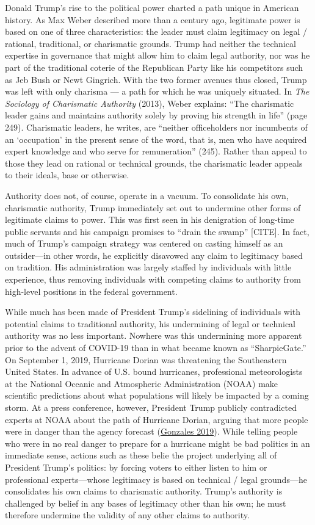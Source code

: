\documentclass[
  12pt,
]{article}
\begin{document}
Donald Trump's rise to the political power charted a path unique in American history. As Max Weber described more than a century ago, legitimate power is based on one of three characteristics: the leader must claim legitimacy on legal / rational, traditional, or charismatic grounds. Trump had neither the technical expertise in governance that might allow him to claim legal authority, nor was he part of the traditional coterie of the Republican Party like his competitors such as Jeb Bush or Newt Gingrich. With the two former avenues thus closed, Trump was left with only charisma --- a path for which he was uniquely situated. In \emph{The Sociology of Charismatic Authority} (2013), Weber explains: ``The charismatic leader gains and maintains authority solely by proving his strength in life'' (page 249). Charismatic leaders, he writes, are ``neither officeholders nor incumbents of an `occupation' in the present sense of the word, that is, men who have acquired expert knowledge and who serve for remuneration'' (245). Rather than appeal to those they lead on rational or technical grounds, the charismatic leader appeals to their ideals, base or otherwise.

Authority does not, of course, operate in a vacuum. To consolidate his own, charismatic authority, Trump immediately set out to undermine other forms of legitimate claims to power. This was first seen in his denigration of long-time public servants and his campaign promises to ``drain the swamp'' {[}CITE{]}. In fact, much of Trump's campaign strategy was centered on casting himself as an outsider---in other words, he explicitly disavowed any claim to legitimacy based on tradition. His administration was largely staffed by individuals with little experience, thus removing individuals with competing claims to authority from high-level positions in the federal government.

While much has been made of President Trump's sidelining of individuals with potential claims to traditional authority, his undermining of legal or technical authority was no less important. Nowhere was this undermining more apparent prior to the advent of COVID-19 than in what became known as ``SharpieGate.'' On September 1, 2019, Hurricane Dorian was threatening the Southeastern United States. In advance of U.S. bound hurricanes, professional meteorologists at the National Oceanic and Atmospheric Administration (NOAA) make scientific predictions about what populations will likely be impacted by a coming storm. At a press conference, however, President Trump publicly contradicted experts at NOAA about the path of Hurricane Dorian, arguing that more people were in danger than the agency forecast (\protect\hyperlink{ref-Gonzales2019}{Gonzales 2019}). While telling people who were in no real danger to prepare for a hurricane might be bad politics in an immediate sense, actions such as these belie the project underlying all of President Trump's politics: by forcing voters to either listen to him or professional experts---whose legitimacy is based on technical / legal grounds---he consolidates his own claims to charismatic authority. Trump's authority is challenged by belief in any bases of legitimacy other than his own; he must therefore undermine the validity of any other claims to authority.
\end{document}
